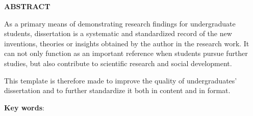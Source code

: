 \clearpage
{}

{}

\begin{center}
{\bfseries\fontsize{16pt}{20pt}\selectfont ABSTRACT}
\end{center}

\vspace{20pt}

As a primary means of demonstrating research findings for undergraduate students, dissertation is a systematic and standardized record of the new inventions, theories or insights obtained by the author in the research work. It can not only function as an important reference when students pursue further studies, but also contribute to scientific research and social development.\par 
This template is therefore made to improve the quality of undergraduates’ dissertation and to further standardize it both in content and in format.

\vspace{20pt}

\noindent\textbf{Key words}: \cquKeywordsEN

